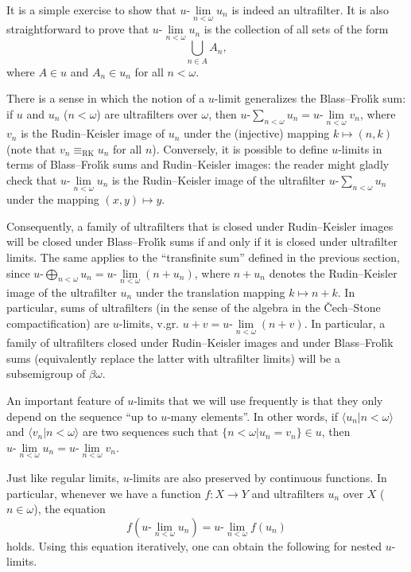 \documentclass[10pt]{amsart}
\newcommand{\ulim}[2]{#1\text{-}\lim\limits_{#2<\omega}}
\newcommand{\usum}[2]{#1\text{-}\sum_{#2<\omega}}
\newcommand{\uadd}[2]{#1\text{-}\bigoplus_{#2<\omega}}
\newcommand{\eqrk}[2]{#1\equiv_{\mathrm{RK}}#2}
\theoremstyle{definition}
\theoremstyle{remark}
\begin{document}
It is a simple exercise to show that $\ulim{u}{n}u_n$ is indeed an ultrafilter. It is also straightforward to prove that $\ulim{u}{n}u_n$ is the collection of all sets of the form
\begin{equation*}
    \bigcup_{n\in A}A_n,
\end{equation*}
where $A\in u$ and $A_n\in u_n$ for all $n<\omega$.

There is a sense in which the notion of a $u$-limit generalizes the Blass--Frol\'{\i}k sum: if $u$ and $u_n$ ($n<\omega$) are ultrafilters over $\omega$, then $\usum{u}{n}u_n=\ulim{u}{n}v_n$, where $v_n$ is the Rudin--Keisler image of $u_n$ under the (injective) mapping $k\longmapsto (n,k)$ (note that $\eqrk{v_n}{u_n}$ for all $n$). Conversely, it is possible to define $u$-limits in terms of Blass--Frol\'{\i}k sums and Rudin--Keisler images: the reader might gladly check that $\ulim{u}{n}u_n$ is the Rudin--Keisler image of the ultrafilter $\usum{u}{n}u_n$ under the mapping $(x,y)\longmapsto y$.

Consequently, a family of ultrafilters that is closed under Rudin--Keisler images will be closed under Blass--Frol\'{\i}k sums if and only if it is closed under ultrafilter limits. The same applies to the ``transfinite sum'' defined in the previous section, since $\uadd{u}{n}u_n=\ulim{u}{n}(n+u_n)$, where $n+u_n$ denotes the Rudin--Keisler image of the ultrafilter $u_n$ under the translation mapping $k\longmapsto n+k$. In particular, sums of ultrafilters (in the sense of the algebra in the \v{C}ech--Stone compactification) are $u$-limits, v.gr. $u+v=\ulim{u}{n}(n+v)$. In particular, a family of ultrafilters closed under Rudin--Keisler images and under Blass--Frol\'{\i}k sums (equivalently replace the latter with ultrafilter limits) will be a subsemigroup of $\beta\omega$.

An important feature of $u$-limits that we will use frequently is that they only depend on the sequence ``up to $u$-many elements''. In other words, if $\langle u_n\big|n<\omega\rangle$ and $\langle v_n\big|n<\omega\rangle$ are two sequences such that $\{n<\omega\big|u_n=v_n\}\in u$, then $\ulim{u}{n}u_n=\ulim{u}{n}v_n$.

Just like regular limits, $u$-limits are also preserved by continuous functions. In particular, whenever we have a function $f:X\longrightarrow Y$ and ultrafilters $u_n$ over $X$ ($n\in\omega$), the equation
\begin{equation}
    f(\ulim{u}{n}u_n)=\ulim{u}{n}f(u_n)
\end{equation}
holds. Using this equation iteratively, one can obtain the following for nested $u$-limits.
\end{document}
